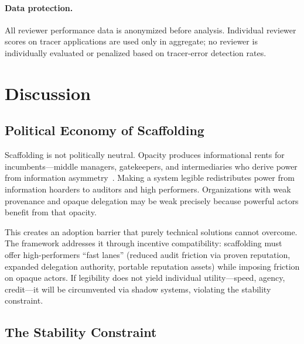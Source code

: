 \documentclass[runningheads]{llncs}
\begin{document}
\paragraph{Data protection.} All reviewer performance data is anonymized before analysis. Individual reviewer scores on tracer applications are used only in aggregate; no reviewer is individually evaluated or penalized based on tracer-error detection rates.


\section{Discussion}
\label{sec:discussion}

\subsection{Political Economy of Scaffolding}

Scaffolding is not politically neutral. Opacity produces informational rents for incumbents---middle managers, gatekeepers, and intermediaries who derive power from information asymmetry~\cite{holmstrom1991multitask}. Making a system legible redistributes power from information hoarders to auditors and high performers. Organizations with weak provenance and opaque delegation may be weak precisely because powerful actors benefit from that opacity.

This creates an adoption barrier that purely technical solutions cannot overcome. The framework addresses it through incentive compatibility: scaffolding must offer high-performers ``fast lanes'' (reduced audit friction via proven reputation, expanded delegation authority, portable reputation assets) while imposing friction on opaque actors. If legibility does not yield individual utility---speed, agency, credit---it will be circumvented via shadow systems, violating the stability constraint.

\subsection{The Stability Constraint}
\end{document}
